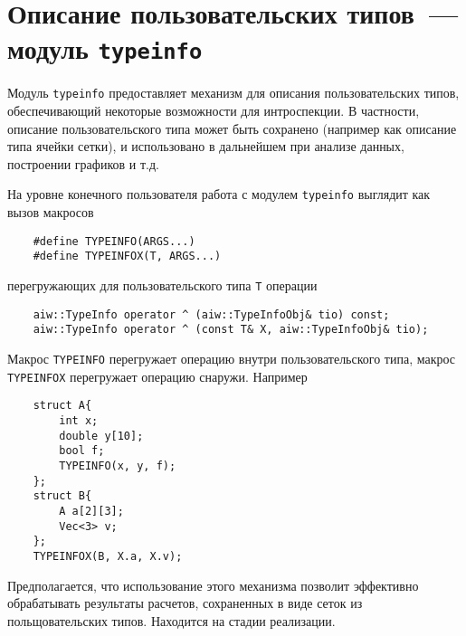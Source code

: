 \section{Описание пользовательских типов~--- модуль {\tt typeinfo}}
Модуль \verb'typeinfo' предоставляет механизм для описания пользовательских типов,
обеспечивающий некоторые возможности для интроспекции. В частности,
описание пользовательского типа может быть сохранено (например как описание типа ячейки сетки),
и использовано в дальнейшем при анализе данных, построении графиков и т.д.

На уровне конечного пользователя работа с модулем \verb'typeinfo' выглядит как вызов макросов
\begin{verbatim}
    #define TYPEINFO(ARGS...)
    #define TYPEINFOX(T, ARGS...)
\end{verbatim}
перегружающих для пользовательского типа \verb'T' операции
\begin{verbatim}
    aiw::TypeInfo operator ^ (aiw::TypeInfoObj& tio) const;
    aiw::TypeInfo operator ^ (const T& X, aiw::TypeInfoObj& tio);
\end{verbatim}
Макрос \verb'TYPEINFO' перегружает операцию внутри пользовательского типа, макрос \verb'TYPEINFOX' перегружает операцию снаружи. Например
\begin{verbatim}
    struct A{
        int x;
        double y[10];
        bool f;
        TYPEINFO(x, y, f);
    }; 
    struct B{
        A a[2][3];
        Vec<3> v;
    }; 
    TYPEINFOX(B, X.a, X.v);
\end{verbatim}

Предполагается, что использование этого механизма позволит эффективно обрабатывать результаты расчетов, сохраненных в виде сеток из польщовательских типов.
Находится на стадии реализации.

